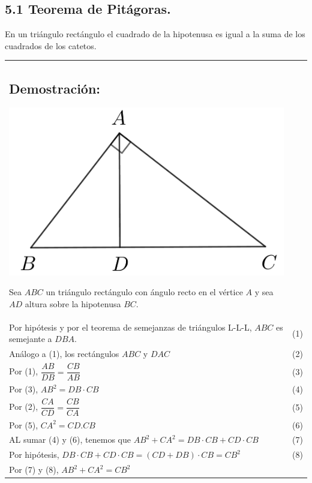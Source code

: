 \documentclass[12pt,a4paper]{article}
\begin{document}
\subsection*{5.1 Teorema de Pitágoras.}
En un triángulo rectángulo el cuadrado de la hipotenusa es igual a la suma de los cuadrados de los catetos.
\\
\begin{tabular}{p{15.9 cm} p{1cm}}
\subsection*{Demostración:}
\begin{center}
\includegraphics[scale=0.8]{pitagoras.png} 
\end{center}
Sea $ABC$ un triángulo rectángulo con ángulo recto en el vértice $A$ y sea $AD$ altura sobre la hipotenusa $BC$.
\\Por hipótesis y por el teorema de semejanzas de triángulos L-L-L, $ABC$ es semejante a $DBA$. &(1)
\\Análogo a (1), los rectángulos $ABC$ y $DAC$ & (2)
\\Por (1), $\dfrac{AB}{DB}=\dfrac{CB}{AB}$ & (3)
\\Por (3), $AB^2=DB \cdot CB$ &(4)
\\Por (2),  $\dfrac{CA}{CD}=\dfrac{CB}{CA}$ &(5)
\\Por (5), $CA^2=CD.CB$ &(6)
\\AL sumar (4) y (6), tenemos que $AB^2+CA^2=DB\cdot CB + CD\cdot CB$ & (7)
\\Por hipótesis, $DB\cdot CB + CD\cdot CB=(CD +DB)\cdot CB=CB^2$ &(8)
\\Por (7) y (8), $AB^2 + CA^2=CB^2$
\end{tabular}
\end{document}
